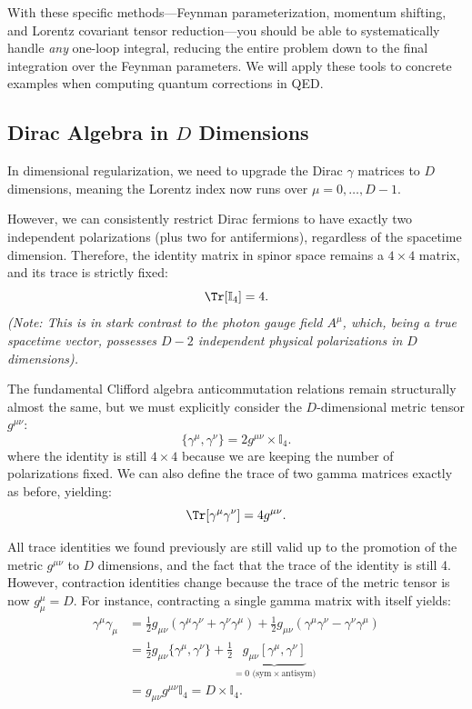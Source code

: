 With these specific methods—Feynman parameterization, momentum shifting, and Lorentz covariant tensor reduction—you should be able to systematically handle \textit{any} one-loop integral, reducing the entire problem down to the final integration over the Feynman parameters. We will apply these tools to concrete examples when computing quantum corrections in QED.

\subsection{Dirac Algebra in \(D\) Dimensions}

In dimensional regularization, we need to upgrade the Dirac \(\gamma\) matrices to \(D\) dimensions, meaning the Lorentz index now runs over \(\mu = 0, \dots, D-1\).

However, we can consistently restrict Dirac fermions to have exactly two independent polarizations (plus two for antifermions), regardless of the spacetime dimension. Therefore, the identity matrix in spinor space remains a \(4 \times 4\) matrix, and its trace is strictly fixed:
\[
    \Tr[\mathbb{I}_4] = 4.
\]
\textit{(Note: This is in stark contrast to the photon gauge field \(A^\mu\), which, being a true spacetime vector, possesses \(D-2\) independent physical polarizations in \(D\) dimensions).}

The fundamental Clifford algebra anticommutation relations remain structurally almost the same, but we must explicitly consider the \(D\)-dimensional metric tensor \(g^{\mu \nu}\):
\[
    \{\gamma^{\mu}, \gamma^{\nu}\} = 2 g^{\mu \nu} \times \mathbb{I}_4.
\]
where the identity is still \(4 \times 4\) because we are keeping the number of polarizations fixed. We can also define the trace of two gamma matrices exactly as before, yielding:
\[
    \Tr[\gamma^\mu \gamma^\nu] = 4 g^{\mu\nu}.
\]

All trace identities we found previously are still valid up to the promotion of the metric \(g^{\mu\nu}\) to \(D\) dimensions, and the fact that the trace of the identity is still 4. However, contraction identities change because the trace of the metric tensor is now \(g_\mu^\mu = D\). For instance, contracting a single gamma matrix with itself yields:
\[
    \begin{aligned}
        \gamma^\mu \gamma_\mu & = \frac{1}{2} g_{\mu\nu} ( \gamma^\mu \gamma^\nu + \gamma^\nu \gamma^\mu ) + \frac{1}{2} g_{\mu\nu} ( \gamma^\mu \gamma^\nu - \gamma^\nu \gamma^\mu )         \\
                              & = \frac{1}{2} g_{\mu\nu} \{ \gamma^\mu, \gamma^\nu \} + \frac{1}{2} \underbrace{g_{\mu\nu} [\gamma^\mu, \gamma^\nu]}_{=0 \text{ (sym} \times \text{antisym)}} \\
                              & = g_{\mu\nu} g^{\mu\nu} \mathbb{I}_4 = D \times \mathbb{I}_4.
    \end{aligned}
\]

